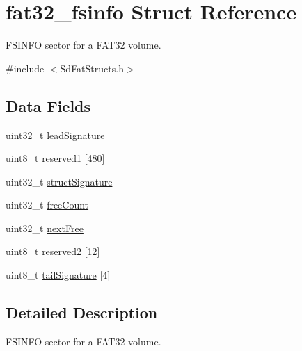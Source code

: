 \hypertarget{structfat32__fsinfo}{\section{fat32\-\_\-fsinfo Struct Reference}
\label{structfat32__fsinfo}
}


F\-S\-I\-N\-F\-O sector for a F\-A\-T32 volume.  




{\ttfamily \#include $<$Sd\-Fat\-Structs.\-h$>$}

\subsection*{Data Fields}
\begin{DoxyCompactItemize}
\item 
uint32\-\_\-t \hyperlink{structfat32__fsinfo_a19196eeae2525130bdb0d39607860743}{lead\-Signature}
\item 
uint8\-\_\-t \hyperlink{structfat32__fsinfo_aed41fe36034f1fcda738da60943924a6}{reserved1} \mbox{[}480\mbox{]}
\item 
uint32\-\_\-t \hyperlink{structfat32__fsinfo_a31ea8ae6a8d32f61dd576d0d4921f015}{struct\-Signature}
\item 
uint32\-\_\-t \hyperlink{structfat32__fsinfo_af5d9e0aff08147617a09dc19d207eafe}{free\-Count}
\item 
uint32\-\_\-t \hyperlink{structfat32__fsinfo_a456cdbc01678df5d05eabb80f5aac9b0}{next\-Free}
\item 
uint8\-\_\-t \hyperlink{structfat32__fsinfo_af6dc8e21f5c1ca5ca997fc835808802c}{reserved2} \mbox{[}12\mbox{]}
\item 
uint8\-\_\-t \hyperlink{structfat32__fsinfo_a89944902cc4effcd8568575786c3a084}{tail\-Signature} \mbox{[}4\mbox{]}
\end{DoxyCompactItemize}


\subsection{Detailed Description}
F\-S\-I\-N\-F\-O sector for a F\-A\-T32 volume. 

